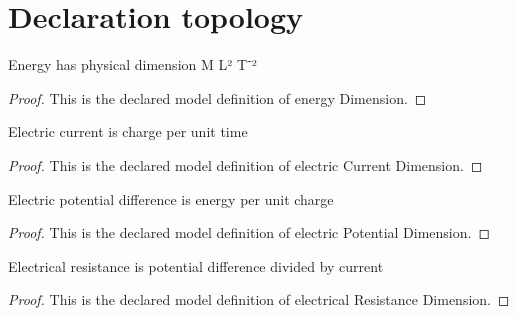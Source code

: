 \section{Declaration topology}
\begin{definition}
  \label{def:physics:phyx-mini-0987:phyxminiproblems-problemphyxmini0987-energydimension}
  Energy has physical dimension M L² T⁻²
\end{definition}
\begin{proof}
  This is the declared model definition of energy Dimension.
\end{proof}
\begin{definition}
  \label{def:physics:phyx-mini-0987:phyxminiproblems-problemphyxmini0987-electriccurrentdimension}
  Electric current is charge per unit time
\end{definition}
\begin{proof}
  This is the declared model definition of electric Current Dimension.
\end{proof}
\begin{definition}
  \label{def:physics:phyx-mini-0987:phyxminiproblems-problemphyxmini0987-electricpotentialdimension}
  Electric potential difference is energy per unit charge
\end{definition}
\begin{proof}
  This is the declared model definition of electric Potential Dimension.
\end{proof}
\begin{definition}
  \label{def:physics:phyx-mini-0987:phyxminiproblems-problemphyxmini0987-electricalresistancedimension}
  Electrical resistance is potential difference divided by current
\end{definition}
\begin{proof}
  This is the declared model definition of electrical Resistance Dimension.
\end{proof}
